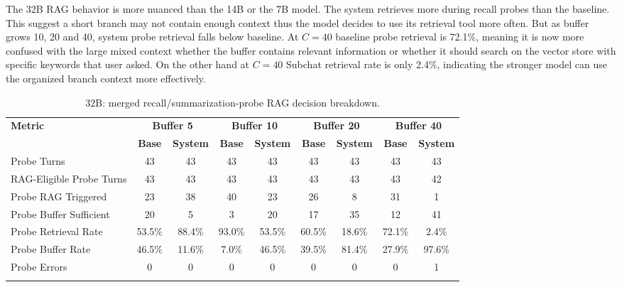 



The 32B RAG behavior is more nuanced than the 14B or the 7B model. The system retrieves more during recall probes than the baseline. This suggest a short branch may not contain enough context thus the model decides to use its retrieval tool more often. But as buffer grows 10, 20 and 40, system probe retrieval falls below baseline. At $C=40$ baseline probe retrieval is 72.1\%, meaning it is now more confused with the large mixed context whether the buffer contains relevant information or whether it should search on the vector store with specific keywords that user asked. On the other hand at $C=40$ Subchat retrieval rate is only 2.4\%, indicating the stronger model can use the organized branch context more effectively. 
 




\begin{table}[htbp]
\caption{32B: merged recall/summarization-probe RAG decision breakdown.}\label{tab:32b_rag_main}
\centering
\tiny
\setlength{\tabcolsep}{2.2pt}
\begin{adjustbox}{width=\textwidth}
\begin{tabular}{lcccccccc}
\toprule
\textbf{Metric} & \multicolumn{2}{c}{\textbf{Buffer 5}} & \multicolumn{2}{c}{\textbf{Buffer 10}} & \multicolumn{2}{c}{\textbf{Buffer 20}} & \multicolumn{2}{c}{\textbf{Buffer 40}} \\
\cmidrule(lr){2-3}\cmidrule(lr){4-5}\cmidrule(lr){6-7}\cmidrule(lr){8-9}
 & \textbf{Base} & \textbf{System} & \textbf{Base} & \textbf{System} & \textbf{Base} & \textbf{System} & \textbf{Base} & \textbf{System} \\
\midrule
Probe Turns & 43 & 43 & 43 & 43 & 43 & 43 & 43 & 43 \\
RAG-Eligible Probe Turns & 43 & 43 & 43 & 43 & 43 & 43 & 43 & 42 \\
Probe RAG Triggered & 23 & 38 & 40 & 23 & 26 & 8 & 31 & 1 \\
Probe Buffer Sufficient & 20 & 5 & 3 & 20 & 17 & 35 & 12 & 41 \\
Probe Retrieval Rate & 53.5\% & 88.4\% & 93.0\% & 53.5\% & 60.5\% & 18.6\% & 72.1\% & 2.4\% \\
Probe Buffer Rate & 46.5\% & 11.6\% & 7.0\% & 46.5\% & 39.5\% & 81.4\% & 27.9\% & 97.6\% \\
Probe Errors & 0 & 0 & 0 & 0 & 0 & 0 & 0 & 1 \\
\botrule
\end{tabular}
\end{adjustbox}
\end{table}

